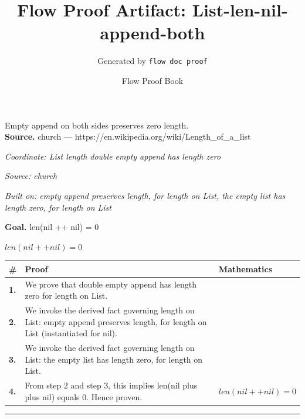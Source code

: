 \documentclass[11pt]{article}
\title{Flow Proof Artifact: List-len-nil-append-both}
\author{Generated by \texttt{flow doc proof}}
\date{Flow Proof Book}
\theoremstyle{definition}
\begin{document}
\maketitle
Empty append on both sides preserves zero length.\\[0.5em]
\textbf{Source.} church — https://en.wikipedia.org/wiki/Length\_of\_a\_list\\[0.5em]
\bigskip
{}\par
\smallskip\noindent\textit{Coordinate: List \cdot length \cdot double empty append has length zero}\par
\smallskip\noindent\textit{Source: church}\par
\smallskip\noindent\textit{Built on: empty append preserves length, for length on List, the empty list has length zero, for length on List}\par
\medskip
\noindent\textbf{Goal.} len(nil ++ nil) = 0\par
\noindent$\displaystyle len(nil ++ nil) = 0$\par
\medskip
\noindent
\begin{tabular}{@{} >{\raggedright\arraybackslash}p{} >{\raggedright\arraybackslash}p{} >{\raggedleft\arraybackslash}p{} @{}}
\textbf{\#} & \textbf{Proof} & \textbf{Mathematics} \\
\midrule
\textbf{1.} & We prove that double empty append has length zero for length on List. & \\[0.45em]
\textbf{2.} & We invoke the derived fact governing length on List: empty append preserves length, for length on List (instantiated for nil). & \\[0.45em]
\textbf{3.} & We invoke the derived fact governing length on List: the empty list has length zero, for length on List. & \\[0.45em]
\textbf{4.} & From step 2 and step 3, this implies len(nil plus plus nil) equals 0. Hence proven. & $\displaystyle len(nil ++ nil) = 0$ \\[0.45em]
\bottomrule
\end{tabular}
\label{thm:List-length-double_empty_append_has_length_zero}
\par\medskip\hrule
\end{document}
